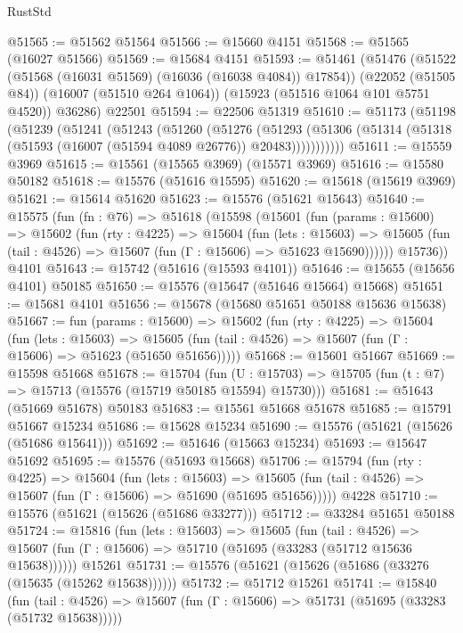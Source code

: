 \begin{lexlean}{RustStd}
\begin{coremodule}
@51565 := @51562 @51564
@51566 := @15660 @4151
@51568 := @51565 (@16027 @51566)
@51569 := @15684 @4151
@51593 := @51461
    (@51476
      (@51522 (@51568 (@16031 @51569) (@16036 (@16038 @4084)) @17854))
      (@22052 (@51505 @84))
      (@16007 (@51510 @264 @1064))
      (@15923 (@51516 @1064 @101 @5751 @4520))
      @36286)
    @22501
@51594 := @22506 @51319
@51610 := @51173
    (@51198
      (@51239
        (@51241
          (@51243
            (@51260
              (@51276
                (@51293
                  (@51306 (@51314 (@51318 (@51593 (@16007 (@51594 @4089 @26776)) @20483)))))))))))
@51611 := @15559 @3969
@51615 := @15561 (@15565 @3969) (@15571 @3969)
@51616 := @15580 @50182
@51618 := @15576 (@51616 @15595)
@51620 := @15618 (@15619 @3969)
@51621 := @15614 @51620
@51623 := @15576 (@51621 @15643)
@51640 := @15575
    (fun (fn : @76) =>
    @51618
      (@15598
        (@15601
          (fun (params : @15600) =>
          @15602
            (fun (rty : @4225) =>
            @15604
              (fun (lets : @15603) =>
              @15605 (fun (tail : @4526) => @15607 (fun (Γ : @15606) => @51623 @15690))))))
        @15736))
    @4101
@51643 := @15742 (@51616 (@15593 @4101))
@51646 := @15655 (@15656 @4101) @50185
@51650 := @15576 (@15647 (@51646 @15664) @15668)
@51651 := @15681 @4101
@51656 := @15678 (@15680 @51651 @50188 @15636 @15638)
@51667 := fun (params : @15600) =>
  @15602
    (fun (rty : @4225) =>
    @15604
      (fun (lets : @15603) =>
      @15605 (fun (tail : @4526) => @15607 (fun (Γ : @15606) => @51623 (@51650 @51656)))))
@51668 := @15601 @51667
@51669 := @15598 @51668
@51678 := @15704
    (fun (U : @15703) => @15705 (fun (t : @7) => @15713 (@15576 (@15719 @50185 @15594) @15730)))
@51681 := @51643 (@51669 @51678) @50183
@51683 := @15561 @51668 @51678
@51685 := @15791 @51667 @15234
@51686 := @15628 @15234
@51690 := @15576 (@51621 (@15626 (@51686 @15641)))
@51692 := @51646 (@15663 @15234)
@51693 := @15647 @51692
@51695 := @15576 (@51693 @15668)
@51706 := @15794
    (fun (rty : @4225) =>
    @15604
      (fun (lets : @15603) =>
      @15605 (fun (tail : @4526) => @15607 (fun (Γ : @15606) => @51690 (@51695 @51656)))))
    @4228
@51710 := @15576 (@51621 (@15626 (@51686 @33277)))
@51712 := @33284 @51651 @50188
@51724 := @15816
    (fun (lets : @15603) =>
    @15605
      (fun (tail : @4526) =>
      @15607 (fun (Γ : @15606) => @51710 (@51695 (@33283 (@51712 @15636 @15638))))))
    @15261
@51731 := @15576 (@51621 (@15626 (@51686 (@33276 (@15635 (@15262 @15638))))))
@51732 := @51712 @15261
@51741 := @15840
    (fun (tail : @4526) => @15607 (fun (Γ : @15606) => @51731 (@51695 (@33283 (@51732 @15638)))))

\end{coremodule}
\end{lexlean}
